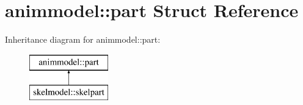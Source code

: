 \hypertarget{structanimmodel_1_1part}{}\section{animmodel\+:\+:part Struct Reference}
\label{structanimmodel_1_1part}
Inheritance diagram for animmodel\+:\+:part\+:\begin{figure}[H]
\begin{center}
\leavevmode
\includegraphics[height=2.000000cm]{structanimmodel_1_1part}
\end{center}
\end{figure}
